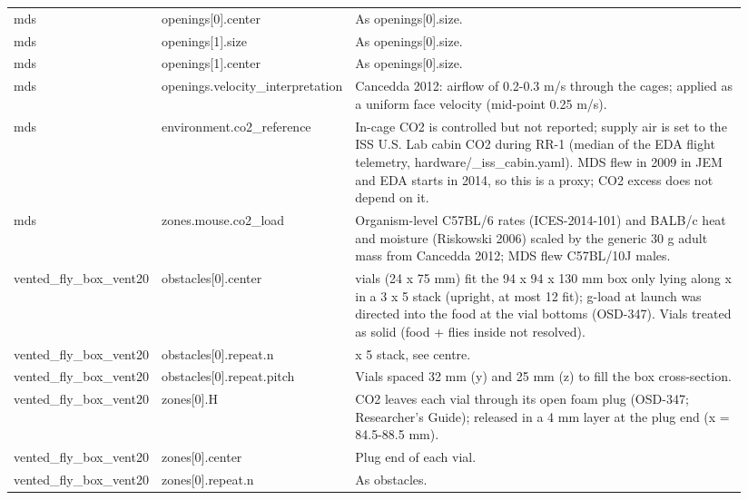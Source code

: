 \begin{longtable}{>{\raggedright\arraybackslash}p{0.17\linewidth}>{\raggedright\arraybackslash}p{0.22\linewidth}>{\raggedright\arraybackslash}p{0.55\linewidth}}
mds & openings[0]\allowbreak{}.\allowbreak{}center & As openings[0].size. \\
mds & openings[1]\allowbreak{}.\allowbreak{}size & As openings[0].size. \\
mds & openings[1]\allowbreak{}.\allowbreak{}center & As openings[0].size. \\
mds & openings.\allowbreak{}velocity\_\allowbreak{}interpretation & Cancedda 2012: airflow of 0.2-0.3 m/s through the cages; applied as a uniform face velocity (mid-point 0.25 m/s). \\
mds & environment.\allowbreak{}co2\_\allowbreak{}reference & In-cage CO2 is controlled but not reported; supply air is set to the ISS U.S. Lab cabin CO2 during RR-1 (median of the EDA flight telemetry, hardware/\_iss\_cabin.yaml). MDS flew in 2009 in JEM and EDA starts in 2014, so this is a proxy; CO2 excess does not depend on it. \\
mds & zones.\allowbreak{}mouse.\allowbreak{}co2\_\allowbreak{}load & Organism-level C57BL/6 rates (ICES-2014-101) and BALB/c heat and moisture (Riskowski 2006) scaled by the generic 30 g adult mass from Cancedda 2012; MDS flew C57BL/10J males. \\
vented\_\allowbreak{}fly\_\allowbreak{}box\_\allowbreak{}vent20 & obstacles[0]\allowbreak{}.\allowbreak{}center & 15 vials (24 x 75 mm) fit the 94 x 94 x 130 mm box only lying along x in a 3 x 5 stack (upright, at most 12 fit); g-load at launch was directed into the food at the vial bottoms (OSD-347). Vials treated as solid (food + flies inside not resolved). \\
vented\_\allowbreak{}fly\_\allowbreak{}box\_\allowbreak{}vent20 & obstacles[0]\allowbreak{}.\allowbreak{}repeat.\allowbreak{}n & 3 x 5 stack, see centre. \\
vented\_\allowbreak{}fly\_\allowbreak{}box\_\allowbreak{}vent20 & obstacles[0]\allowbreak{}.\allowbreak{}repeat.\allowbreak{}pitch & Vials spaced 32 mm (y) and 25 mm (z) to fill the box cross-section. \\
vented\_\allowbreak{}fly\_\allowbreak{}box\_\allowbreak{}vent20 & zones[0]\allowbreak{}.\allowbreak{}H & CO2 leaves each vial through its open foam plug (OSD-347; Researcher's Guide); released in a 4 mm layer at the plug end (x = 84.5-88.5 mm). \\
vented\_\allowbreak{}fly\_\allowbreak{}box\_\allowbreak{}vent20 & zones[0]\allowbreak{}.\allowbreak{}center & Plug end of each vial. \\
vented\_\allowbreak{}fly\_\allowbreak{}box\_\allowbreak{}vent20 & zones[0]\allowbreak{}.\allowbreak{}repeat.\allowbreak{}n & As obstacles. \\

\end{longtable}
